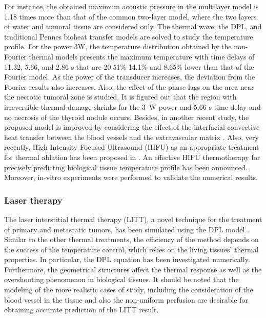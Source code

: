 \documentclass[sn-mathphys]{sn-jnl}%
\theoremstyle{thmstyleone}%
\theoremstyle{thmstyletwo}%
\theoremstyle{thmstylethree}%
\begin{document}
{For instance, the obtained maximum acoustic pressure in the multilayer model is 1.18 times more than that of the common two-layer model, where the two layers of water and tumoral tissue are considered only. The thermal wave, the DPL, and traditional Pennes bioheat transfer models are solved to study the temperature profile. For the power 3W, the temperature distribution obtained by the non-Fourier thermal models presents the maximum temperature with time delays of 11.32, 5.66, and 2.86 s that are 20.51$\%$ 14.1$\%$ and 8.65$\%$ lower than that of the Fourier model. As the power of the transducer increases, the deviation from the Fourier results also increases. Also, the effect of the phase lags on the area near the necrotic tumoral zone is studied. It is figured out that the region with irreversible thermal damage shrinks for the 3~W power and 5.66 s time delay and no necrosis of the thyroid nodule occurs. Besides, in another recent study, the proposed model is improved by considering the effect of the interfacial convective heat transfer between the blood vessels and the extravascular matrix \cite{Namakshenas2020}. Also, very recently, High Intensity Focused Ultrasound (HIFU) as an appropriate treatment for thermal ablation has been proposed in \cite{Singh2020}. An effective HIFU thermotherapy for precisely predicting biological tissue temperature profile has been announced. Moreover, in-vitro experiments were performed to validate the numerical results.

\subsubsection{Laser therapy}
The laser interstitial thermal therapy (LITT), a novel technique for the treatment of primary and metastatic tumors, has been simulated using the DPL model \cite{Mohajer2016}. Similar to the other thermal treatments, the efficiency of the method depends on the success of the temperature control, which relies on the living tissues' thermal properties. In particular, the DPL equation has been investigated numerically. Furthermore, the geometrical structures affect the thermal response as well as the overshooting phenomenon in biological tissues. It should be noted that the modeling of the more realistic cases of study, including the consideration of the blood vessel in the tissue and also the non-uniform perfusion are desirable for obtaining accurate prediction of the LITT result.

}
\end{document}
